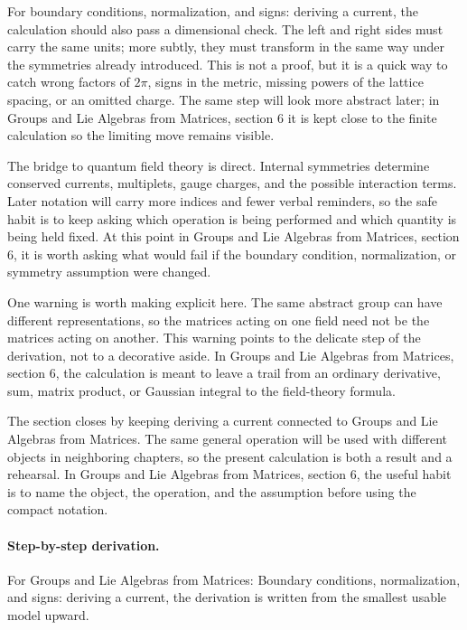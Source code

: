 For boundary conditions, normalization, and signs: deriving a current, the calculation should also pass a dimensional check.  The left and right sides must carry the same units; more subtly, they must transform in the same way under the symmetries already introduced.  This is not a proof, but it is a quick way to catch wrong factors of \(2\pi\), signs in the metric, missing powers of the lattice spacing, or an omitted charge.  The same step will look more abstract later; in Groups and Lie Algebras from Matrices, section 6 it is kept close to the finite calculation so the limiting move remains visible.

The bridge to quantum field theory is direct.  Internal symmetries determine conserved currents, multiplets, gauge charges, and the possible interaction terms.  Later notation will carry more indices and fewer verbal reminders, so the safe habit is to keep asking which operation is being performed and which quantity is being held fixed.  At this point in Groups and Lie Algebras from Matrices, section 6, it is worth asking what would fail if the boundary condition, normalization, or symmetry assumption were changed.

One warning is worth making explicit here.  The same abstract group can have different representations, so the matrices acting on one field need not be the matrices acting on another.  This warning points to the delicate step of the derivation, not to a decorative aside.  In Groups and Lie Algebras from Matrices, section 6, the calculation is meant to leave a trail from an ordinary derivative, sum, matrix product, or Gaussian integral to the field-theory formula.

The section closes by keeping deriving a current connected to Groups and Lie Algebras from Matrices.  The same general operation will be used with different objects in neighboring chapters, so the present calculation is both a result and a rehearsal.  In Groups and Lie Algebras from Matrices, section 6, the useful habit is to name the object, the operation, and the assumption before using the compact notation.



\paragraph{Step-by-step derivation.}

For Groups and Lie Algebras from Matrices: Boundary conditions, normalization, and signs: deriving a current, the derivation is written from the smallest usable model upward.


